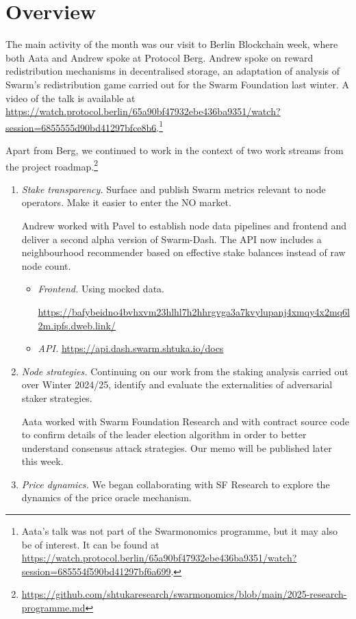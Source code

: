 \maketitle
\section*{Overview}

The main activity of the month was our visit to Berlin Blockchain week, where both Aata and Andrew spoke at Protocol Berg.
%
Andrew spoke on reward redistribution mechanisms in decentralised storage, an adaptation of analysis of Swarm's redistribution game carried out for the Swarm Foundation last winter.
%
A video of the talk is available at \url{https://watch.protocol.berlin/65a90bf47932ebe436ba9351/watch?session=6855555d90bd41297bfce8b6}.\footnote{Aata's talk was not part of the Swarmonomics programme, but it may also be of interest. It can be found at \url{https://watch.protocol.berlin/65a90bf47932ebe436ba9351/watch?session=685554f590bd41297bf6a699}.}

Apart from Berg, we continued to work in the context of two work streams from the project roadmap.\footnote{\url{https://github.com/shtukaresearch/swarmonomics/blob/main/2025-research-programme.md}}

\begin{enumerate}
\item \emph{Stake transparency.} Surface and publish Swarm metrics relevant to node operators. Make it easier to enter the NO market.

Andrew worked with Pavel to establish node data pipelines and frontend and deliver a second alpha version of Swarm-Dash.
%
The API now includes a neighbourhood recommender based on effective stake balances instead of raw node count.

\begin{itemize}
  \item \emph{Frontend.} Using mocked data. 
  
  {\small \url{https://bafybeidno4bvhxvm23hlhl7h2hhrgvga3a7kvylupanj4xmqy4x2mq6l2m.ipfs.dweb.link/}}
  \item \emph{API.} \url{https://api.dash.swarm.shtuka.io/docs}
\end{itemize}

\item \emph{Node strategies.}  Continuing on our work from the staking analysis carried out over Winter 2024/25, identify and evaluate the externalities of adversarial staker strategies.

Aata worked with Swarm Foundation Research and with contract source code to confirm details of the leader election algorithm in order to better understand consensus attack strategies. 
%
Our memo will be published later this week.

\item \emph{Price dynamics.} We began collaborating with SF Research to explore the dynamics of the price oracle mechanism.

\end{enumerate}

